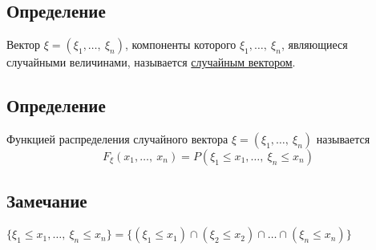 \documentclass[12pt, a4paper]{article}
\begin{document}
    \subsection*{Определение}
    Вектор $\xi = (\xi_1,\dots,\ \xi_n)$, компоненты которого $\xi_1,\dots,\ \xi_n$, являющиеся случайными величинами, называется \underline{случайным вектором}.
    \subsection*{Определение}
    Функцией распределения случайного вектора $\xi = (\xi_1,\dots,\ \xi_n)$ называется
    \[F_{\xi}(x_1,\dots,\ x_n) = P(\xi_1 \leq x_1,\dots,\ \xi_n \leq x_n)\]
    \subsection*{Замечание}
    $\{\xi_1 \leq x_1,\dots,\ \xi_n \leq x_n\} = \{(\xi_1\leq x_1)\cap(\xi_2 \leq x_2) \cap \dots \cap (\xi_n \leq x_n)\}$
\end{document}
